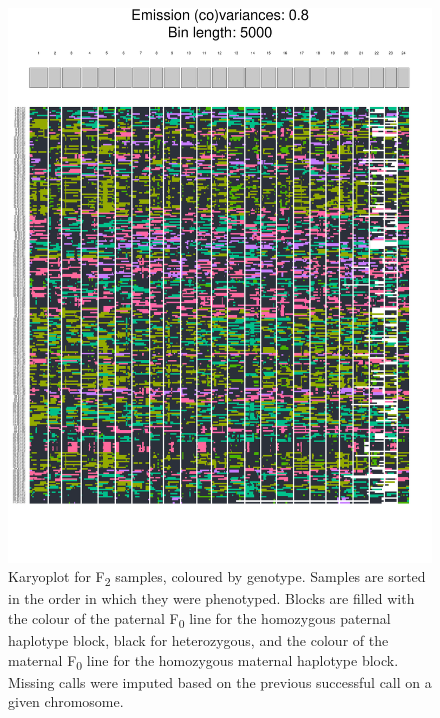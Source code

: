 \documentclass[
]{book}
\begin{document}
\begin{figure}
\includegraphics[width=1\linewidth]{figs/mikk_behaviour/karyoplot_no_missing} \caption{Karyoplot for F\textsubscript{2} samples, coloured by genotype. Samples are sorted in the order in which they were phenotyped. Blocks are filled with the colour of the paternal F\textsubscript{0} line for the homozygous paternal haplotype block, black for heterozygous, and the colour of the maternal F\textsubscript{0} line for the homozygous maternal haplotype block. Missing calls were imputed based on the previous successful call on a given chromosome.}\label{fig:F2-recomb-blocks}
\end{figure}
\end{document}

